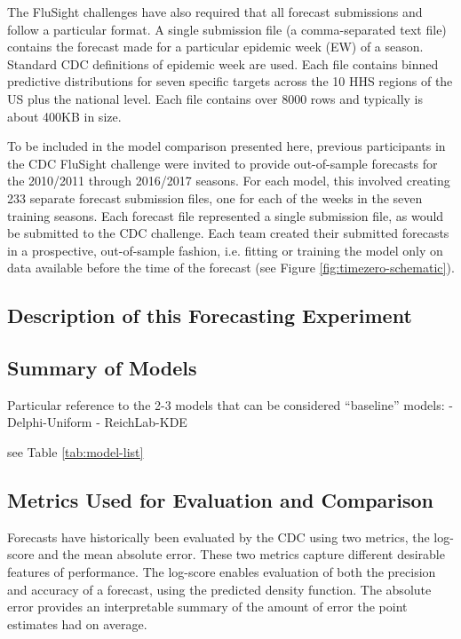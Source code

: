\documentclass{article}\usepackage[]{graphicx}\usepackage[]{color}
\begin{document}
The FluSight challenges have also required that all forecast submissions and follow a particular format. A single submission file (a comma-separated text file) contains the forecast made for a particular epidemic week (EW) of a season. Standard CDC definitions of epidemic week are used. Each file contains binned predictive distributions for seven specific targets across the 10 HHS regions of the US plus the national level. Each file contains over 8000 rows and typically is about 400KB in size.

To be included in the model comparison presented here, previous participants in the CDC FluSight challenge were invited to provide out-of-sample forecasts for the 2010/2011 through 2016/2017 seasons. For each model, this involved creating 233 separate forecast submission files, one for each of the weeks in the seven training seasons.
Each forecast file represented a single submission file, as would be submitted to the CDC challenge. 
Each team created their submitted forecasts in a prospective, out-of-sample fashion, i.e. fitting or training the model only on data available before the time of the forecast (see Figure \ref{fig:timezero-schematic}). 

\subsection{Description of this Forecasting Experiment}


\subsection{Summary of Models}

Particular reference to the 2-3 models that can be considered ``baseline'' models:
 - Delphi-Uniform
 - ReichLab-KDE

see Table \ref{tab:model-list}




\subsection{Metrics Used for Evaluation and Comparison}

Forecasts have historically been evaluated by the CDC using two metrics, the log-score and the mean absolute error. These two metrics capture different desirable features of performance. The log-score enables evaluation of both the precision and accuracy of a forecast, using the predicted density function.\cite{Gneiting2007} The absolute error provides an interpretable summary of the amount of error the point estimates had on average.\cite{Reich2016} 
\end{document}
